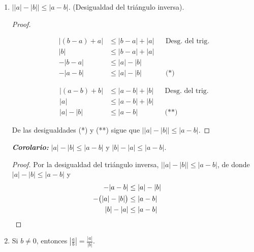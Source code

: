 \documentclass[11pt]{article}
\newcommand{\bfit}[1]{\textbf{\textit{#1}}}
\begin{document}
\begin{enumerate}[label=\alph*)]
 \item $\big| |a|-|b| \big| \leq |a-b|$. (Desigualdad del triángulo inversa).

 \begin{proof} \leavevmode
 \begin{center}\vspace{-2.5em}
 \begin{minipage}[t]{.5\linewidth}
 \begin{align*}
  |(b-a)+a| &\leq |b-a|+|a| && \text{Desg. del trig.} \\
  |b| &\leq |b-a|+|a| \\
  -|b-a| &\leq |a|-|b| \\
  -|a-b| &\leq |a|-|b| && \text{(*)}
 \end{align*}
 \end{minipage}%
 \begin{minipage}[t]{.5\linewidth}
 \begin{align*}
  |(a-b)+b| &\leq |a-b|+|b| && \text{Desg. del trig.} \\
  |a| &\leq |a-b|+|b| \\
  |a|-|b| &\leq |a-b| && \text{(**)}
 \end{align*}
 \end{minipage}
 \end{center}
 De las desigualdades (*) y (**) sigue que $\big| |a| - |b| \big| \leq |a-b|$.
 \end{proof}

 \bfit{Corolario:} $|a|-|b|\leq |a-b|$ y $|b|-|a|\leq |a-b|$.
 \begin{proof}
 Por la desigualdad del triángulo inversa, $\big| |a|-|b| \big| \leq |a-b|$, de donde $|a|-|b|\leq |a-b|$ y \begin{align*}
  -|a-b| &\leq |a|-|b|\\
  -\bigl(|a|-|b|\bigr) &\leq |a-b| \\
  |b|-|a| &\leq |a-b| && \qedhere
 \end{align*}
 \end{proof}

\item Si $b\neq 0$, entonces $\left| \frac{a}{b} \right| = \frac{|a|}{|b|}$.


\end{enumerate}
\end{document}
